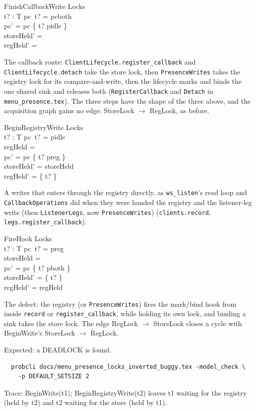 \documentclass[a4paper,10pt,fleqn]{article}
\begin{document}
\begin{schema}{FinishCallbackWrite}
  \Delta Locks \\
  t? : T
\where
  pc~t? = pcboth \\
  pc' = pc \oplus \{ t? \mapsto pidle \} \\
  storeHeld' = \emptyset \\
  regHeld' = \emptyset
\end{schema}

The callback route: \texttt{ClientLifecycle.register\_callback} and
\texttt{ClientLifecycle.detach} take the store lock, then
\texttt{PresenceWrites} takes the registry lock for its compare-and-write, then
the lifecycle marks and binds the one shared sink and releases both
(\texttt{RegisterCallback} and \texttt{Detach} in \texttt{menu\_presence.tex}).
The three steps have the shape of the three above, and the acquisition graph
gains no edge: StoreLock $\to$ RegLock, as before.

\begin{schema}{BeginRegistryWrite}
  \Delta Locks \\
  t? : T
\where
  pc~t? = pidle \\
  regHeld = \emptyset \\
  pc' = pc \oplus \{ t? \mapsto preg \} \\
  storeHeld' = storeHeld \\
  regHeld' = \{ t? \}
\end{schema}

A writer that enters through the registry directly, as
\texttt{ws\_listen}'s read loop and \texttt{CallbackOperations} did when they
were handed the registry and the listener-leg write (then
\texttt{ListenerLegs}, now \texttt{PresenceWrites})
(\texttt{clients.record}, \texttt{legs.register\_callback}).

\begin{schema}{FireHook}
  \Delta Locks \\
  t? : T
\where
  pc~t? = preg \\
  storeHeld = \emptyset \\
  pc' = pc \oplus \{ t? \mapsto pboth \} \\
  storeHeld' = \{ t? \} \\
  regHeld' = regHeld
\end{schema}

The defect: the registry (or \texttt{PresenceWrites}) fires the mark/bind hook
from inside \texttt{record} or \texttt{register\_callback}, while holding its
own lock, and binding a sink takes the store lock. The edge RegLock $\to$
StoreLock closes a cycle with BeginWrite's StoreLock $\to$ RegLock.

Expected: a DEADLOCK is found.

\begin{verbatim}
  probcli docs/menu_presence_locks_inverted_buggy.tex -model_check \
    -p DEFAULT_SETSIZE 2
\end{verbatim}

Trace: BeginWrite(t1); BeginRegistryWrite(t2) leaves t1 waiting for the
registry (held by t2) and t2 waiting for the store (held by t1).
\end{document}
